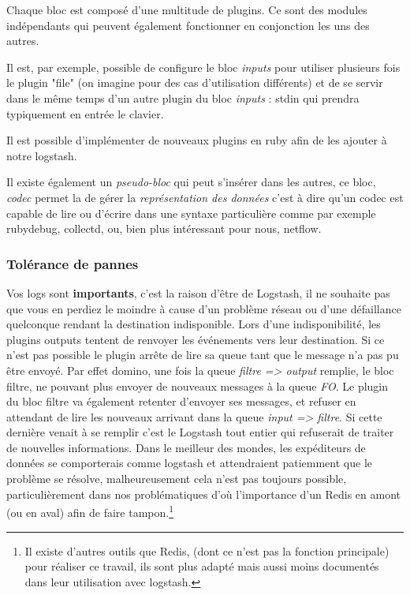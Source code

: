 Chaque bloc est composé d'une multitude de plugins. Ce sont des modules indépendants
qui peuvent également fonctionner en conjonction les uns des autres.

Il est, par exemple, possible de configure le bloc \emph{inputs} pour utiliser 
plusieurs fois le plugin "file" (on imagine pour des cas d'utilisation différents) 
et de se servir dans le même temps d'un autre plugin du bloc \emph{inputs} : stdin 
qui prendra typiquement en entrée le clavier.


Il est possible d'implémenter de nouveaux plugins en ruby afin de les ajouter à
notre logstash.

Il existe également un \textit{pseudo-bloc} qui peut s'insérer dans les autres, ce 
bloc, \emph{codec} permet la de gérer la \textit{représentation des données} c'est 
à dire qu'un codec est capable de lire ou d'écrire dans une syntaxe particulière 
comme par exemple rubydebug, collectd, ou, bien plus intéressant pour nous, netflow.




\subsubsection{Tolérance de pannes}
Vos logs sont \textbf{importants}, c'est la raison d'être de Logstash, il ne souhaite 
pas que vous en perdiez le moindre à cause d'un problème réseau ou d'une défaillance
quelconque rendant la destination indisponible.
Lors d'une indisponibilité, les plugins outputs tentent de renvoyer les événements 
vers leur destination. Si ce n'est pas possible le plugin arrête de lire sa queue 
tant que le message n'a pas pu être envoyé. Par effet domino, une fois la queue 
\textit{filtre => output} remplie, le bloc filtre, ne pouvant plus envoyer de nouveaux 
messages à la queue \textit{FO}. Le plugin du bloc filtre va également retenter 
d'envoyer ses messages, et refuser en attendant de lire les nouveaux arrivant dans 
la queue \textit{input => filtre}.
Si cette dernière venait à se remplir c'est le Logstash tout entier qui refuserait de 
traiter de nouvelles informations. Dans le meilleur des mondes, les expéditeurs de
données se comporterais comme logstash et attendraient patiemment que le problème
se résolve, malheureusement cela n'est pas toujours possible, particulièrement dans
nos problématiques d'où l'importance d'un Redis en amont (ou en aval) afin de 
faire tampon.\footnote{Il existe d'autres outils que Redis, (dont ce n'est pas la fonction
principale) pour réaliser ce travail, ils sont plus adapté mais aussi moins documentés
dans leur utilisation avec logstash.}

